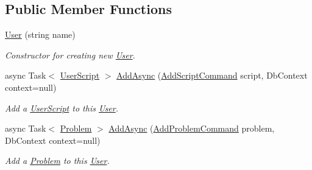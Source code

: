 \subsection*{Public Member Functions}
\begin{DoxyCompactItemize}
\item 
\mbox{\hyperlink{class_code_a_friend_1_1_data_model_1_1_user_a5604cc5f196cf59ac2b4b036d20b2227}{User}} (string name)
\begin{DoxyCompactList}\small\item\em Constructor for creating new \mbox{\hyperlink{class_code_a_friend_1_1_data_model_1_1_user}{User}}.\end{DoxyCompactList}\item 
async Task$<$ \mbox{\hyperlink{class_code_a_friend_1_1_data_model_1_1_user_script}{User\+Script}} $>$ \mbox{\hyperlink{class_code_a_friend_1_1_data_model_1_1_user_accaaafd48c85875b1d61622c4e58db05}{Add\+Async}} (\mbox{\hyperlink{class_code_a_friend_1_1_data_model_1_1_user_1_1_add_script_command}{Add\+Script\+Command}} script, Db\+Context context=null)
\begin{DoxyCompactList}\small\item\em Add a \mbox{\hyperlink{class_code_a_friend_1_1_data_model_1_1_user_script}{User\+Script}} to this \mbox{\hyperlink{class_code_a_friend_1_1_data_model_1_1_user}{User}}. \end{DoxyCompactList}\item 
async Task$<$ \mbox{\hyperlink{class_code_a_friend_1_1_data_model_1_1_problem}{Problem}} $>$ \mbox{\hyperlink{class_code_a_friend_1_1_data_model_1_1_user_a15aa0e1bb20abcd45da38e11f30bb6e4}{Add\+Async}} (\mbox{\hyperlink{class_code_a_friend_1_1_data_model_1_1_user_1_1_add_problem_command}{Add\+Problem\+Command}} problem, Db\+Context context=null)
\begin{DoxyCompactList}\small\item\em Add a \mbox{\hyperlink{class_code_a_friend_1_1_data_model_1_1_problem}{Problem}} to this \mbox{\hyperlink{class_code_a_friend_1_1_data_model_1_1_user}{User}}. \end{DoxyCompactList}\end{DoxyCompactItemize}
